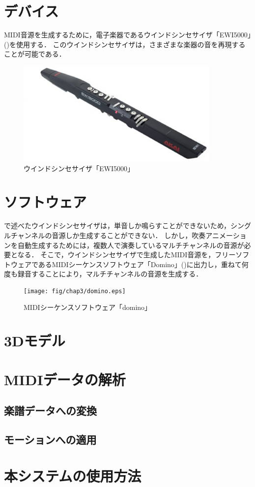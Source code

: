\section{デバイス} \label{sec:device}
MIDI音源を生成するために，電子楽器であるウインドシンセサイザ「EWI5000」()を使用する．
このウインドシンセサイザは，さまざまな楽器の音を再現することが可能である．
\begin{figure}[h]
	\centering
	\includegraphics[width=10cm]{fig/chap3/ewi.eps}
	\caption{ウインドシンセサイザ「EWI5000」}
	\label{fig:ewi}
\end{figure}

\section{ソフトウェア} \label{sec:software}
で述べたウインドシンセサイザは，単音しか鳴らすことができないため，シングルチャンネルの音源しか生成することができない．
しかし，吹奏アニメーションを自動生成するためには，複数人で演奏しているマルチチャンネルの音源が必要となる．
そこで，ウインドシンセサイザで生成したMIDI音源を，フリーソフトウェアであるMIDIシーケンスソフトウェア「Domino」()に出力し，重ねて何度も録音することにより，マルチチャンネルの音源を生成する．
\begin{figure}[h]
	\centering
	\texttt{[image: fig/chap3/domino.eps]}
	\caption{MIDIシーケンスソフトウェア「domino」}
	\label{fig:domino}
	
\end{figure}

\section{3Dモデル} \label{sec:3Dmodel}

\section{MIDIデータの解析} \label{sec:analysis}

\subsection{楽譜データへの変換}

\subsection{モーションへの適用}

\section{本システムの使用方法} \label{sec:howto}